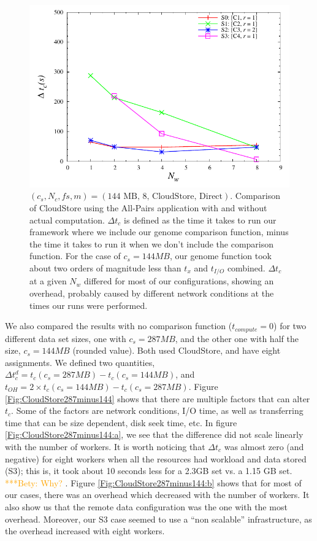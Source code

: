 \documentclass{rspublic}
\newcommand{\betynote}[1]{ {\textcolor{orange} { ***Bety: #1 }}}
\begin{document}
\begin{figure}
\begin{center}
\includegraphics[scale=0.5]{data/graphs/CloudStoreComputeMinusNoCompute144}
\caption{$(c_s, N_c, f\!s, m) = (\mbox{144 MB, 8, CloudStore,
Direct})$. Comparison of CloudStore using the All-Pairs application with
and without actual computation. $\Delta t_c$ is defined as the time it
takes to run our framework where we include our genome comparison
function, minus the time it takes to run it when we don't include the
comparison function. For the case of $c_s=144MB$, our genome function
took about two orders of magnitude less than $t_x$ and $t_{I/O}$
combined. $\Delta t_c$ at a given $N_w$ differed for most of our
configurations, showing an overhead, probably caused by different
network conditions at the times our runs were performed.}
\label{Fig:experiment4}
\end{center}
\end{figure}

We also compared the results with no comparison function
($t_{compute}=0$) for two different data set sizes, one with $c_s =
287MB$, and the other one with half the size, $c_s = 144MB$ (rounded
value). Both used CloudStore, and have eight assignments. We defined two
quantities, $\Delta t_c^d = t_c(c_s = 287MB) - t_c(c_s = 144MB)$, and
$t_{OH} = 2 \times t_c(c_s = 144MB) - t_c(c_s = 287MB)$. Figure
\ref{Fig:CloudStore287minus144} shows that there are multiple factors
that can alter $t_c$. Some of the factors are network conditions, I/O
time, as well as transferring time that can be size dependent, disk seek
time, etc. In figure \ref{Fig:CloudStore287minus144:a}, we see that the
difference did not scale linearly with the number of workers. It is
worth noticing that $\Delta t_c$ was almost zero (and negative) for
eight workers when all the resources had workload and data stored (S3);
this is, it took about 10 seconds less for a 2.3GB set vs. a 1.15 GB
set. \betynote {Why?}. Figure \ref{Fig:CloudStore287minus144:b} shows
that for most of our cases, there was an overhead which decreased with
the number of workers. It also show us that the remote data
configuration was the one with the most overhead. Moreover, our S3 case
seemed to use a ``non scalable'' infrastructure, as the overhead
increased with eight workers.
\end{document}
